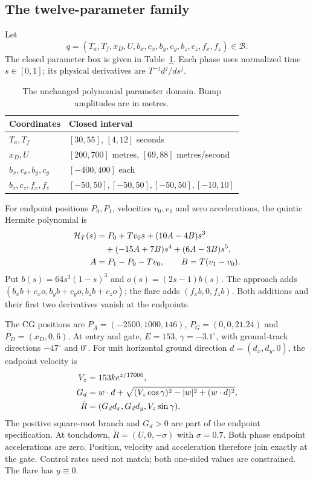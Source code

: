 \subsection{The twelve-parameter family}
Let
\[
 q=(T_a,T_f,x_D,U,b_x,c_x,b_y,c_y,b_z,c_z,f_x,f_z)
 \in\mathcal B.
\]
The closed parameter box is given in Table~\ref{tab:parameters}. Each phase uses normalized time $s\in[0,1]$; its physical derivatives are $T^{-j}d^j/ds^j$.
\begin{table}[htbp]\centering\caption{The unchanged polynomial parameter domain. Bump amplitudes are in metres.}\label{tab:parameters}
\begin{tabular}{ll}\toprule
Coordinates & Closed interval\\\midrule
$T_a,T_f$ & $[30,55]$, $[4,12]$ seconds\\
$x_D,U$ & $[200,700]$ metres, $[69,88]$ metres/second\\
$b_x,c_x,b_y,c_y$ & $[-400,400]$ each\\
$b_z,c_z,f_x,f_z$ & $[-50,50],[-50,50],[-50,50],[-10,10]$\\\bottomrule
\end{tabular}\end{table}

For endpoint positions $P_0,P_1$, velocities $v_0,v_1$ and zero accelerations, the quintic Hermite polynomial is
\begin{align}\label{eq:hermite}
 \mathcal H_T(s)&=P_0+Tv_0s+(10A-4B)s^3\notag\\
 &\quad+(-15A+7B)s^4+(6A-3B)s^5,\notag\\
 A&=P_1-P_0-Tv_0,\qquad B=T(v_1-v_0).
\end{align}
Put $b(s)=64s^3(1-s)^3$ and $o(s)=(2s-1)b(s)$. The approach adds $(b_xb+c_xo,b_yb+c_yo,b_zb+c_zo)$; the flare adds $(f_xb,0,f_zb)$. Both additions and their first two derivatives vanish at the endpoints.

The CG positions are $P_A=(-2500,1000,146)$, $P_G=(0,0,21.24)$ and $P_D=(x_D,0,6)$. At entry and gate, $E=153$, $\gamma=-3.1^\circ$, with ground-track directions $-47^\circ$ and $0^\circ$. For unit horizontal ground direction $d=(d_x,d_y,0)$, the endpoint velocity is
\begin{align}\label{eq:endvelocity}
 V_z&=153k e^{z/17000},\notag\\
 G_d&=w\cdot d+\sqrt{(V_z\cos\gamma)^2-|w|^2+(w\cdot d)^2},\notag\\
 \dot R&=(G_dd_x,G_dd_y,V_z\sin\gamma).
\end{align}
The positive square-root branch and $G_d>0$ are part of the endpoint specification. At touchdown, $\dot R=(U,0,-\sigma)$ with $\sigma=0.7$. Both phase endpoint accelerations are zero. Position, velocity and acceleration therefore join exactly at the gate. Control rates need not match; both one-sided values are constrained. The flare has $y\equiv0$.

